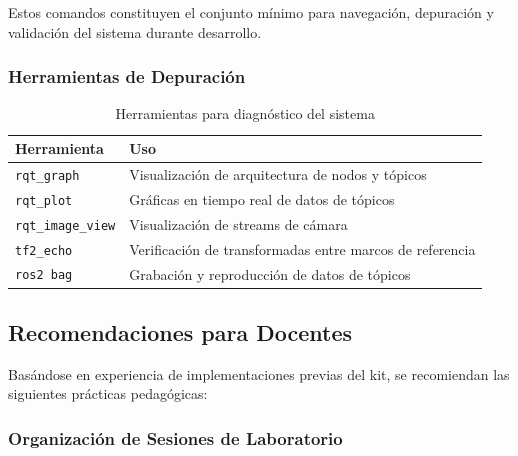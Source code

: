 Estos comandos constituyen el conjunto mínimo para navegación, depuración y validación del sistema durante desarrollo.

\subsubsection{Herramientas de Depuración}

\begin{table}[H]
\centering
\caption{Herramientas para diagnóstico del sistema}
\label{tab:herramientasDiag}
\small
\begin{tabular}{|l|p{8cm}|}
\hline
\textbf{Herramienta} & \textbf{Uso} \\
\hline
\texttt{rqt\_graph} & Visualización de arquitectura de nodos y tópicos \\
\texttt{rqt\_plot} & Gráficas en tiempo real de datos de tópicos \\
\texttt{rqt\_image\_view} & Visualización de streams de cámara \\
\texttt{tf2\_echo} & Verificación de transformadas entre marcos de referencia \\
\texttt{ros2 bag} & Grabación y reproducción de datos de tópicos \\
\hline
\end{tabular}
\end{table}

\subsection{Recomendaciones para Docentes}

Basándose en experiencia de implementaciones previas del kit, se recomiendan las siguientes prácticas pedagógicas:

\subsubsection{Organización de Sesiones de Laboratorio}

